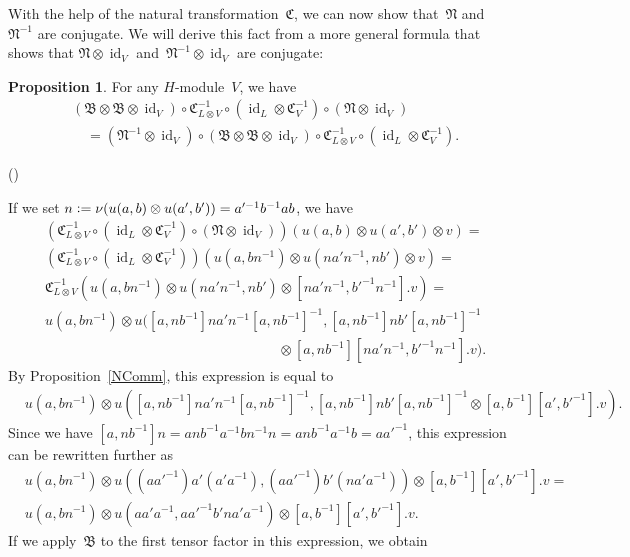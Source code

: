 \documentclass[12pt]{article}
\makeatletter
\newcounter{num}
\newenvironment{pflist}{\begin{list}{(\arabic{num})}{\usecounter{num} \leftmargin0cm \itemindent5pt}}{\end{list}}
\theoremstyle{definition}
\newtheorem{Proposition}[Satz]{Proposition}
\theoremstyle{break}
\renewenvironment{proof}[1][\proofname]{\par
\vspace{-5pt}%
\pushQED{\qed}%
\normalfont
\topsep0pt \partopsep0pt %
\trivlist
\item[\hskip\labelsep
\bfseries
#1\@addpunct{.}]\ignorespaces
}{%
\popQED\endtrivlist\@endpefalse
\addvspace{6pt plus 6pt} %
}
\DeclareMathOperator\id{id}
\newcommand{\fB}{\mathfrak{B}}
\newcommand{\fC}{\mathfrak{C}}
\newcommand{\fN}{\mathfrak{N}}
\renewcommand{\1}{\mathbbm{1}}
\newcommand{\ot}{\mathbin{\otimes}}
\newcommand{\uu}{u}
\newcommand{\deq}{\vcentcolon =}
\makeatother
\begin{document}
With the help of the natural transformation~$\fC$, we can now show that~$\fN$ and~$\fN^{-1}$ are conjugate. We will derive this fact from a more general formula that shows that
$\fN \ot \id_V$ and~$\fN^{-1} \ot \id_V$ are conjugate:
\begin{Proposition} \label{PropertN}
For any $H$-module~$V$, we have
\begin{align*}
&(\fB \ot \fB \ot \id_V)  \circ \fC_{L \ot V}^{-1} \circ (\id_L \ot \fC_V^{-1})
\circ (\fN \ot \id_V) \\
& \quad =
(\fN^{-1} \ot \id_V) \circ (\fB \ot \fB \ot \id_V)  \circ \fC_{L \ot V}^{-1}
\circ (\id_L \ot \fC_V^{-1}).
\end{align*}
\end{Proposition}
\begin{proof}
\begin{pflist}
\item
If we set $n \deq \nu(\uu(a,b) \ot \uu(a',b')) = a'^{-1} b^{-1} a b$, we have
\begin{align*}
&(\fC_{L \ot V}^{-1} \circ (\id_L \ot \fC_V^{-1}) \circ (\fN \ot \id_V))
(\uu(a,b) \ot \uu(a',b') \ot v) = \\
&(\fC_{L \ot V}^{-1} \circ (\id_L \ot \fC_V^{-1}))
(\uu(a, bn^{-1}) \ot \uu(na'n^{-1}, nb') \ot v) =  \\
&\fC_{L \ot V}^{-1}
(\uu(a, bn^{-1}) \ot \uu(na'n^{-1}, nb') \ot [na'n^{-1}, b'^{-1} n^{-1}].v) =  \\
&\uu(a, bn^{-1}) \ot
\uu([a, nb^{-1}]na'n^{-1}[a, nb^{-1}]^{-1}, [a, nb^{-1}]nb'[a, nb^{-1}]^{-1} \\
&\mspace{300mu} \ot [a, nb^{-1}][na'n^{-1}, b'^{-1} n^{-1}].v).
\end{align*}
By Proposition~\ref{NComm}, this expression is equal to
\begin{align*}
&\uu(a, bn^{-1}) \ot
\uu([a, nb^{-1}]na'n^{-1}[a, nb^{-1}]^{-1}, [a, nb^{-1}]nb'[a, nb^{-1}]^{-1}
\ot [a, b^{-1}][a', b'^{-1}].v).
\end{align*}
Since we have
$[a, nb^{-1}] n = a nb^{-1} a^{-1} b n^{-1} n = a nb^{-1} a^{-1} b = a a'^{-1}$,
this expression can be rewritten further as
\begin{align*}
&\uu(a, bn^{-1}) \ot
\uu((a a'^{-1}) a' (a' a^{-1}), (a a'^{-1}) b' (n a' a^{-1}))
\ot [a, b^{-1}][a', b'^{-1}].v = \\
&\uu(a, bn^{-1}) \ot \uu(a a' a^{-1}, a a'^{-1} b' n a' a^{-1})
\ot [a, b^{-1}][a', b'^{-1}].v.
\end{align*}
If we apply~$\fB$ to the first tensor factor in this expression, we obtain

\end{pflist}
\end{proof}
\end{document}
